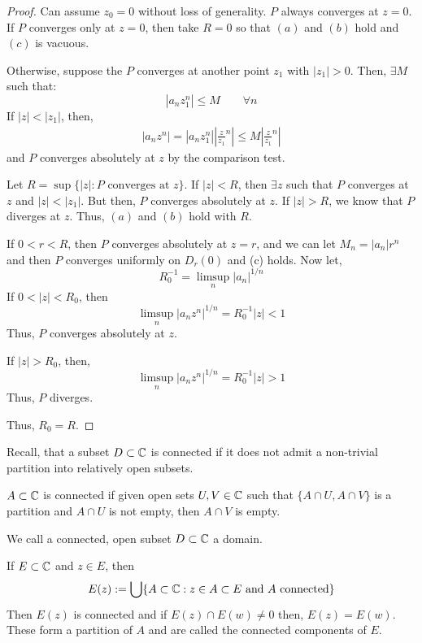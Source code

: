 \documentclass[12pt]{amsart}
\begin{document}
\begin{proof}
    Can assume $z_0 = 0$ without loss of generality. $P$ always converges at $z = 0$. If $P$ converges only at $z = 0$, then take $R = 0$ so that $(a)$ and $(b)$ hold and $(c)$ is vacuous. 
    
    Otherwise, suppose the $P$ converges at another point $z_1$ with $|z_1| > 0$. Then, $\exists M$ such that:
    \[ |a_nz_1^n| \leq M \qquad \forall n\]
    If $|z| < |z_1|$, then, 
    \begin{align*}
        |a_nz^n| = |a_nz_1^n| \left|\frac{z}{z_1}^n\right| \leq M \left|\frac{z}{z_1}^n\right|
    \end{align*}
    and $P$ converges absolutely at $z$ by the comparison test. 

    Let $R = \sup \{ |z| : P \text{ converges at } z\}$. If $|z| < R$, then $\exists z$ such that $P$ converges at $z$ and $|z| < |z_1|$. But then, $P$ converges absolutely at $z$. If $|z| > R$, we know that $P$ diverges at $z$. Thus, $(a)$ and $(b)$ hold with $R$. 

    If $0 < r < R$, then $P$ converges absolutely at $z = r$, and we can let $M_n = |a_n|r^n$ and then $P$ converges uniformly on $D_r(0)$ and (c) holds.
    Now let,
    \[ R_0^{-1} = \limsup_n |a_n|^{1/n}\]
    If $0 < |z| < R_0$, then
    \[ \limsup_n |a_nz^n|^{1/n} = R_0^{-1}|z| < 1\]
    Thus, $P$ converges absolutely at $z$. 
    
    If $|z| > R_0$, then, 
    \[  \limsup_n |a_nz^n|^{1/n} = R_0^{-1} |z| > 1\]
    Thus, $P$ diverges. 

    Thus, $R_0 = R$. 
\end{proof}

Recall, that a subset $D \subset \mathbb C$ is connected if it does not admit a non-trivial partition into relatively open subsets.
\begin{remark}
    $A \subset \mathbb C$ is connected if given open sets $U, V \in \mathbb C$ such that $\{ A \cap U, A \cap V \}$ is a partition and $A \cap U$ is not empty, then $A \cap V$ is empty. 
\end{remark} 

\begin{definition}
    We call a connected, open subset $D \subset \mathbb C$ a domain. 
\end{definition}

If $E \subset \mathbb C$ and $z \in E$, then 
\[ E(z) := \bigcup \{ A \subset \mathbb C : z \in A \subset E \text{ and } A \text{ connected} \}\]
Then $E(z)$ is connected and if $E(z) \cap E(w) \neq 0$ then, $E(z) = E(w)$. These form a partition of $A$ and are called the connected components of $E$. 
\end{document}
